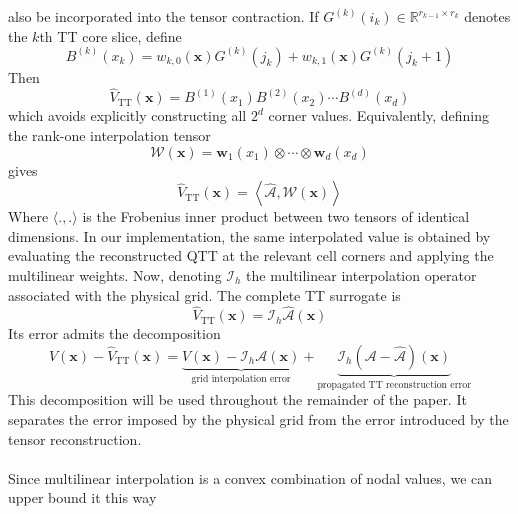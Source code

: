 \documentclass{article}
\numberwithin{equation}{subsection}
\theoremstyle{definition}
\theoremstyle{remark}
\begin{document}
also be incorporated into the tensor contraction. If $G^{(k)}(i_k) \in \mathbb{R}^{r_{k-1}\times r_k}$
denotes the $k$th TT core slice, define
\begin{equation}
B^{(k)}(x_k) = w_{k,0}(\boldsymbol{x})G^{(k)}(j_k) + w_{k,1}(\boldsymbol{x})G^{(k)}(j_k+1)
\end{equation}
Then
\begin{equation}
\widehat{V}_{\mathrm{TT}}(\boldsymbol{x}) = B^{(1)}(x_1) B^{(2)}(x_2) \cdots B^{(d)}(x_d)
\end{equation}
which avoids explicitly constructing all $2^d$ corner values. Equivalently, defining the rank-one interpolation tensor
\begin{equation}
\mathcal{W}(\boldsymbol{x}) = \boldsymbol{w}_1(x_1) \otimes\cdots\otimes \boldsymbol{w}_d(x_d)
\end{equation}
gives
\begin{equation}
\widehat{V}_{\mathrm{TT}}(\boldsymbol{x}) = \left\langle \widehat{\mathcal{A}}, \mathcal{W}(\boldsymbol{x}) \right\rangle
\end{equation}
Where $\langle .,.\rangle$ is the Frobenius inner product between two tensors of identical dimensions. In our implementation, the same interpolated value is obtained by evaluating
the reconstructed QTT at the relevant cell corners and applying the multilinear
weights.
Now, denoting $\mathcal{I}_h$ the multilinear interpolation operator associated
with the physical grid. The complete TT surrogate is
\begin{equation}
\widehat{V}_{\mathrm{TT}}(\boldsymbol{x}) = \mathcal{I}_h\widehat{\mathcal{A}}(\boldsymbol{x})
\end{equation}
Its error admits the decomposition
\begin{equation}
V(\boldsymbol{x})
-
\widehat{V}_{\mathrm{TT}}(\boldsymbol{x})
=
\underbrace{
V(\boldsymbol{x})
-
\mathcal{I}_h\mathcal{A}(\boldsymbol{x})
}_{\text{grid interpolation error}}
+
\underbrace{
\mathcal{I}_h
\left(
\mathcal{A}-\widehat{\mathcal{A}}
\right)(\boldsymbol{x})
}_{\text{propagated TT reconstruction error}}
\label{eq:deterministic-error-decomposition}
\end{equation}
This decomposition will be used throughout the remainder of the paper. It
separates the error imposed by the physical grid from the error introduced by
the tensor reconstruction.\\
\\
Since multilinear interpolation is a convex combination of nodal values, we can upper bound it this way 
\end{document}
